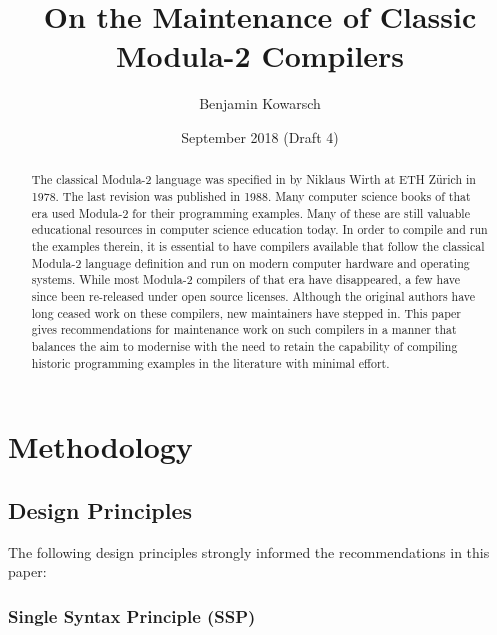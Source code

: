\documentclass[10pt,a4paper]{article}
\title{On the Maintenance of Classic Modula-2 Compilers}
\author{Benjamin Kowarsch}
\date{September 2018 (Draft 4)}
\makeatletter
\newcommand{\verbatimfont}[1]{\def\verbatim@font{#1}}
\makeatother
\begin{document}
\verbatimfont{\fontfamily{lmtt}\selectfont}
\maketitle

\begin{abstract}
The classical Modula-2 language was specified in \cite{Wirth78} by Niklaus
Wirth at ETH Z\"{u}rich in 1978. The last revision \cite{Wirth88} was
published in 1988. Many computer science books of that era used Modula-2 for
their programming examples. Many of these are still valuable educational
resources in computer science education today. In order to compile and run the
examples therein, it is essential to have compilers available that follow the
classical Modula-2 language definition and run on modern computer hardware and
operating systems. While most Modula-2 compilers of that era have disappeared,
a few have since been re-released under open source licenses. Although the
original authors have long ceased work on these compilers, new maintainers
have stepped in. This paper gives recommendations for maintenance work on such
compilers in a manner that balances the aim to modernise with the need to
retain the capability of compiling historic programming examples in the
literature with minimal effort.
\end{abstract}


\section{Methodology}

\subsection{Design Principles}
\label{design-principles}

The following design principles strongly informed the recommendations in this
paper:

\subsubsection{Single Syntax Principle (SSP)}
\label{SSP}
\end{document}
